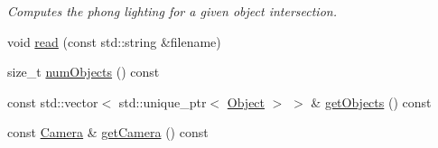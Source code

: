\begin{DoxyCompactItemize}
\begin{DoxyCompactList}\small\item\em Computes the phong lighting for a given object intersection. \end{DoxyCompactList}\item 
void \hyperlink{classScene_a15d828d5f43ff11466712b9203082316}{read} (const std\+::string \&filename)
\item 
size\+\_\+t \hyperlink{classScene_a27b9b9e915a87fd7736dd82d71da372a}{num\+Objects} () const 
\item 
const std\+::vector$<$ std\+::unique\+\_\+ptr$<$ \hyperlink{structObject}{Object} $>$ $>$ \& \hyperlink{classScene_af93d8de4ef126b8eb2ea2daa076c1234}{get\+Objects} () const 
\item 
const \hyperlink{classCamera}{Camera} \& \hyperlink{classScene_afd60c6c2e82759640767543220b9c70d}{get\+Camera} () const 
\end{DoxyCompactItemize}

